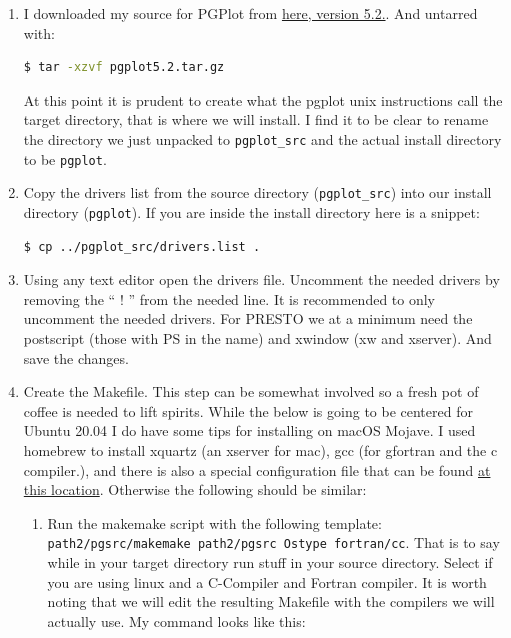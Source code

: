 \documentclass{article}
\begin{document}
    	\begin{enumerate}
    	\item \noindent I downloaded my source for PGPlot from \href{ftp://ftp.astro.caltech.edu/pub/pgplot/pgplot5.2.tar.gz}{here, version 5.2.}. And untarred with: 
    	\begin{lstlisting}[language=bash]
    	$ tar -xzvf pgplot5.2.tar.gz
    	\end{lstlisting}
    	 At this point it is prudent to create what the pgplot unix instructions call the target directory, that is where we will install. I find it to be clear to rename the directory we just unpacked to \texttt{pgplot\_src} and the actual install directory to be \texttt{pgplot}. 
    	\item Copy the drivers list from the source directory (\texttt{pgplot\_src}) into our install directory (\texttt{pgplot}). If you are inside the install directory here is a snippet: \noindent
    	\begin{lstlisting}[language=bash]
    	$ cp ../pgplot_src/drivers.list .
    	\end{lstlisting} 
    	\item Using any text editor open the drivers file. Uncomment the needed drivers by removing the `` ! '' from the needed line. It is recommended to only uncomment the needed drivers. For PRESTO we at a minimum need the postscript (those with PS in the name) and xwindow (xw and xserver). And save the changes. 
    	\item Create the Makefile. This step can be somewhat involved so a fresh pot of coffee is needed to lift spirits. While the below is going to be centered for Ubuntu 20.04 I do have some tips for installing on macOS Mojave. I used homebrew to install xquartz (an xserver for mac), gcc (for gfortran and the c compiler.), and there is also a special configuration file that can be found \href{http://mingus.as.arizona.edu/~bjw/software/pgplot_macosx_conf.tar}{at this location}. Otherwise the following should be similar:
    		\begin{enumerate}
    			\item Run the makemake script with the following template: \texttt{path2/pgsrc/makemake path2/pgsrc Ostype fortran/cc}. That is to say while in your target directory run stuff in your source directory. Select if you are using linux and a C-Compiler and Fortran compiler. It is worth noting that we will edit the resulting Makefile with the compilers we will actually use. My command looks like this: \begin{lstlisting}[language=bash]


\end{lstlisting}
\end{enumerate}
\end{enumerate}
\end{document}
